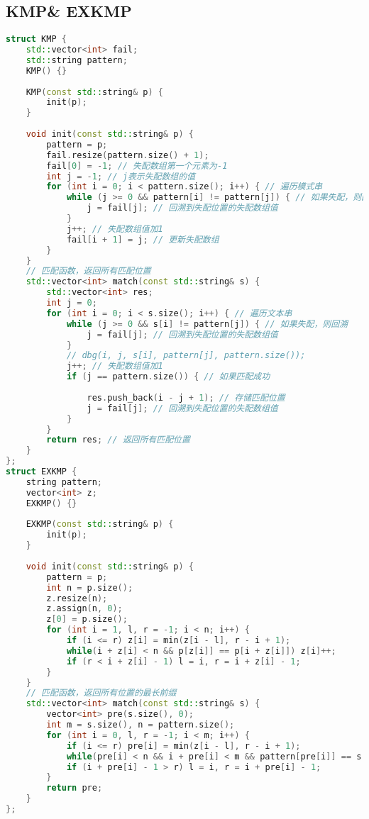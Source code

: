 \subsection{KMP\& EXKMP}
\begin{lstlisting}[language=c++]
struct KMP {
    std::vector<int> fail; 
    std::string pattern; 
    KMP() {} 
    
    KMP(const std::string& p) {
        init(p);
    }
    
    void init(const std::string& p) {
        pattern = p; 
        fail.resize(pattern.size() + 1); 
        fail[0] = -1; // 失配数组第一个元素为-1
        int j = -1; // j表示失配数组的值
        for (int i = 0; i < pattern.size(); i++) { // 遍历模式串
            while (j >= 0 && pattern[i] != pattern[j]) { // 如果失配，则回溯
                j = fail[j]; // 回溯到失配位置的失配数组值
            }
            j++; // 失配数组值加1
            fail[i + 1] = j; // 更新失配数组
        }
    }
    // 匹配函数，返回所有匹配位置
    std::vector<int> match(const std::string& s) {
        std::vector<int> res; 
        int j = 0; 
        for (int i = 0; i < s.size(); i++) { // 遍历文本串
            while (j >= 0 && s[i] != pattern[j]) { // 如果失配，则回溯
                j = fail[j]; // 回溯到失配位置的失配数组值
            }
            // dbg(i, j, s[i], pattern[j], pattern.size());
            j++; // 失配数组值加1
            if (j == pattern.size()) { // 如果匹配成功
            	
                res.push_back(i - j + 1); // 存储匹配位置
                j = fail[j]; // 回溯到失配位置的失配数组值
            }
        }
        return res; // 返回所有匹配位置
    }
};
struct EXKMP {
    string pattern;
    vector<int> z;
    EXKMP() {} 
    
    EXKMP(const std::string& p) {
        init(p);
    }
    
    void init(const std::string& p) {
        pattern = p;
        int n = p.size();
        z.resize(n);
        z.assign(n, 0);
        z[0] = p.size();
        for (int i = 1, l, r = -1; i < n; i++) {
            if (i <= r) z[i] = min(z[i - l], r - i + 1);
            while(i + z[i] < n && p[z[i]] == p[i + z[i]]) z[i]++;
            if (r < i + z[i] - 1) l = i, r = i + z[i] - 1;
        }
    }
    // 匹配函数，返回所有位置的最长前缀
    std::vector<int> match(const std::string& s) {
        vector<int> pre(s.size(), 0);
        int m = s.size(), n = pattern.size();
        for (int i = 0, l, r = -1; i < m; i++) {
            if (i <= r) pre[i] = min(z[i - l], r - i + 1);
            while(pre[i] < n && i + pre[i] < m && pattern[pre[i]] == s[i + pre[i]]) pre[i]++;
            if (i + pre[i] - 1 > r) l = i, r = i + pre[i] - 1;
        }
        return pre;
    }
};
\end{lstlisting}